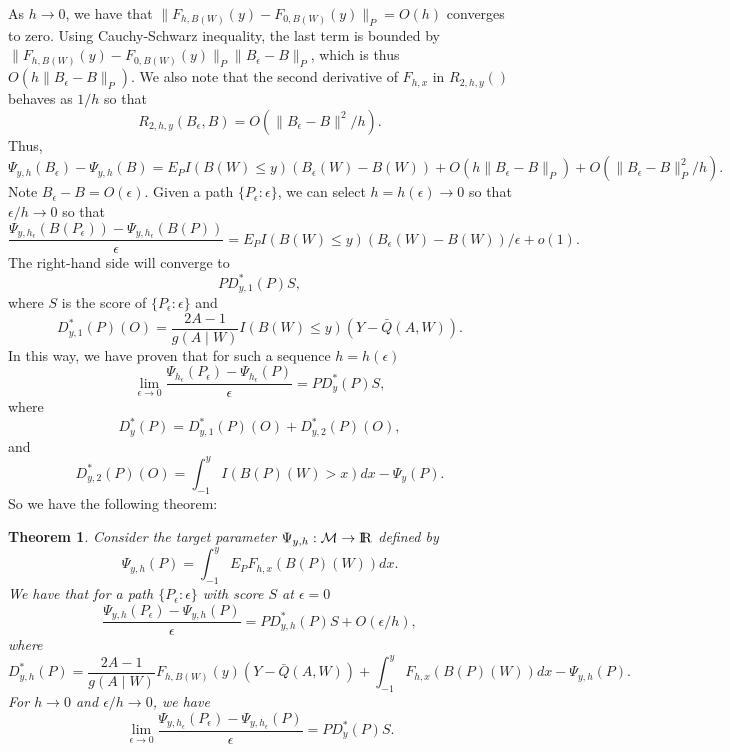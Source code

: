 \documentclass[11pt]{article}
\newtheorem{theorem}{Theorem}
\newcommand{\pl}{\parallel}
\newcommand{\openr}{\hbox{${\rm I\kern-.2em R}$}}
\begin{document}
As $h\rightarrow 0$, we have that $\pl F_{h,B(W)}(y)-F_{0,B(W)}(y)\pl_{P}=O(h)$ converges to zero.
Using Cauchy-Schwarz inequality, the last term is bounded by $\pl F_{h,B(W)}(y)-F_{0,B(W)}(y)\pl_P\pl B_{\epsilon}-B\pl_P$, which is thus
$O(h \pl B_{\epsilon}-B\pl_P)$.
We also note that the second derivative of $F_{h,x}$ in $R_{2,h,y}()$ behaves as $1/h$ so that \[
R_{2,h,y}(B_{\epsilon},B)=O(\pl B_{\epsilon}-B\pl^2/h).\]
Thus, 
\[
\Psi_{y,h}(B_{\epsilon})-\Psi_{y,h}(B)=E_P I(B(W)\leq y)(B_{\epsilon}(W)-B(W))+O(h\pl B_{\epsilon}-B\pl_P)+O(\pl B_{\epsilon}-B\pl^2_P/h).\]
Note $B_{\epsilon}-B=O(\epsilon)$.
Given a path $\{P_{\epsilon}:\epsilon\}$, we can select $h=h(\epsilon)\rightarrow 0$ so that $\epsilon/h\rightarrow 0$ so that
\[
\frac{\Psi_{y,h_{\epsilon}}(B(P_{\epsilon}))-\Psi_{y,h_{\epsilon}}(B(P))}{\epsilon}=
E_P I(B(W)\leq y)(B_{\epsilon}(W)-B(W))/\epsilon +o(1).\]
The right-hand side will converge to 
\[
P D^*_{y,1}(P) S,\]
where $S$ is the score of $\{P_{\epsilon}:\epsilon\}$ and 
\[
D^*_{y,1}(P)(O)=\frac{2A-1}{g(A\mid W)}I(B(W)\leq y)(Y-\bar{Q}(A,W)).\]
In this way, we have proven that for such a sequence $h=h(\epsilon)$
\[
\lim_{\epsilon\rightarrow 0}\frac{\Psi_{h_{\epsilon}}(P_{\epsilon})-\Psi_{h_{\epsilon}}(P)}{\epsilon}=
P D^*_y(P) S,\]
where
\[
D^*_y(P)=D^*_{y,1}(P)(O)+D^*_{y,2}(P)(O),\]
and \[
D^*_{y,2}(P)(O)=\int_{-1}^y I(B(P)(W)>x) dx-\Psi_y(P).\]
So we have the following theorem:
\begin{theorem}
Consider the target parameter $\Psi_{y,h}:{\cal M}\rightarrow\openr$ defined by
\[
\Psi_{y,h}(P)=\int_{-1}^y E_P F_{h,x}(B(P)(W)) dx.
\]
We have that for a path $\{P_{\epsilon}:\epsilon\}$ with score $S$ at $\epsilon =0$
\[
\frac{\Psi_{y,h}(P_{\epsilon})-\Psi_{y,h}(P)}{\epsilon}=P D^*_{y,h}(P)S+O(\epsilon/h),\]
where 
\[
D^*_{y,h}(P)=\frac{2A-1}{g(A\mid W)}F_{h,B(W)}(y)(Y-\bar{Q}(A,W))+\int_{-1}^y F_{h,x}(B(P)(W)) dx -\Psi_{y,h}(P).\]
For $h\rightarrow 0$ and $\epsilon/h\rightarrow 0$, we have
\[
\lim_{\epsilon\rightarrow 0}\frac{\Psi_{y,h_{\epsilon}}(P_{\epsilon})-\Psi_{y,h_{\epsilon}}(P)}{\epsilon}=PD^*_y(P)S.\]
\end{theorem}
\end{document}
